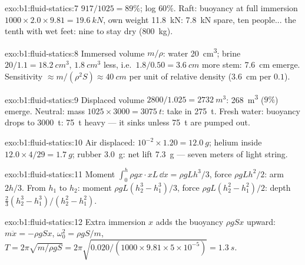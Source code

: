 \begin{solution}{exo:b1:fluid-statics:7}
$917/1025 = 89\%$; log $60\%$. Raft: buoyancy at full immersion $1000 \times
2.0 \times 9.81 = \qty{19.6}{kN}$, own weight \qty{11.8}{kN}: \qty{7.8}{kN}
spare, ten people... the tenth with wet feet: nine to stay dry
(\qty{800}{kg}).
\end{solution}

\begin{solution}{exo:b1:fluid-statics:8}
Immersed volume $m/\rho$: water \qty{20}{cm^3}; brine $20/1.1 = \qty{18.2}{cm^3}$,
$\qty{1.8}{cm^3}$ less, i.e.\ $1.8/0.50 = \qty{3.6}{cm}$ more stem: \qty{7.6}{cm}
emerge. Sensitivity $\approx m/(\rho^2S) \approx \qty{40}{cm}$ per unit of relative
density (\qty{3.6}{cm} per $0.1$).
\end{solution}

\begin{solution}{exo:b1:fluid-statics:9}
Displaced volume $2800/1.025 = \qty{2732}{m^3}$: \qty{268}{m^3} ($9\%$)
emerge. Neutral: mass $1025 \times 3000 = \qty{3075}{t}$: take in \qty{275}{t}.
Fresh water: buoyancy drops to \qty{3000}{t}: \qty{75}{t} heavy --- it sinks
unless \qty{75}{t} are pumped out.
\end{solution}

\begin{solution}{exo:b1:fluid-statics:10}
Air displaced: $10^{-2} \times 1.20 = \qty{12.0}{g}$; helium inside $12.0 \times
4/29 = \qty{1.7}{g}$; rubber \qty{3.0}{g}: net lift \qty{7.3}{g} --- seven meters
of light string.
\end{solution}

\begin{solution}{exo:b1:fluid-statics:11}
Moment $\int_0^h\rho gx\cdot xL\,\dd x = \rho gLh^3/3$, force $\rho gLh^2/2$:
arm $2h/3$. From $h_1$ to $h_2$: moment $\rho gL(h_2^3 - h_1^3)/3$, force
$\rho gL(h_2^2 - h_1^2)/2$: depth $\frac23(h_2^3 - h_1^3)/(h_2^2 - h_1^2)$.
\end{solution}

\begin{solution}{exo:b1:fluid-statics:12}
Extra immersion $x$ adds the buoyancy $\rho gSx$ upward: $m\ddot x = -\rho gSx$,
$\omega_0^2 = \rho gS/m$, $T = 2\pi\sqrt{m/\rho gS} = 2\pi\sqrt{0.020/(1000 \times
9.81 \times 5\times10^{-5})} = \qty{1.3}{s}$.
\end{solution}

